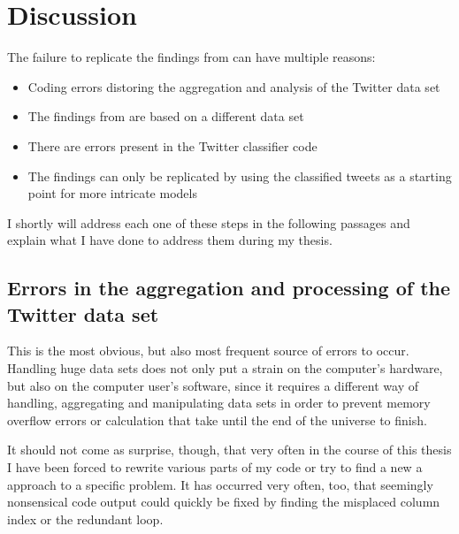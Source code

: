 \documentclass[11pt, a4paper]{report}\usepackage[]{graphicx}\usepackage[]{color}
\begin{document}
\chapter{Discussion}
\label{ch:discussion}
The failure to replicate the findings from \citep{bodnar_data_2015} can have multiple reasons: 

\begin{itemize}
\item Coding errors distoring the aggregation and analysis of the Twitter data set
\item The findings from \citep{bodnar_data_2015} are based on a different data set
\item There are errors present in the Twitter classifier code
\item The findings can only be replicated by using the classified tweets as a starting point for more intricate models
\end{itemize}

I shortly will address each one of these steps in the following passages and explain what I have done to address them during my thesis. 

\section{Errors in the aggregation and processing of the Twitter data set}
This is the most obvious, but also most frequent source of errors to occur. Handling huge data sets does not only put a strain on the computer's hardware, but also on the computer user's software, since it requires a different way of handling, aggregating and manipulating data sets in order to prevent memory overflow errors or calculation that take until the end of the universe to finish.\newline

It should not come as surprise, though, that very often in the course of this thesis I have been forced to rewrite various parts of my code or try to find a new a approach to a specific problem. It has occurred very often, too, that seemingly nonsensical code output could quickly be fixed by finding the misplaced column index or the redundant loop.\newline
\end{document}
